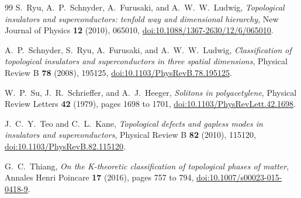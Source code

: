 \documentclass[12pt]{article}
\theoremstyle{definition}
\theoremstyle{remark}
\begin{document}
\begin{thebibliography}{99}
S.~Ryu, A.~P.~Schnyder, A.~Furusaki, and A.~W.~W.~Ludwig,
\emph{Topological insulators and superconductors: tenfold way and
dimensional hierarchy},
New Journal of Physics \textbf{12} (2010), 065010,
\href{https://doi.org/10.1088/1367-2630/12/6/065010}{doi:10.1088/1367-2630/12/6/065010}.

A.~P.~Schnyder, S.~Ryu, A.~Furusaki, and A.~W.~W.~Ludwig,
\emph{Classification of topological insulators and superconductors in three
spatial dimensions},
Physical Review B \textbf{78} (2008), 195125,
\href{https://doi.org/10.1103/PhysRevB.78.195125}{doi:10.1103/PhysRevB.78.195125}.

W.~P.~Su, J.~R.~Schrieffer, and A.~J.~Heeger,
\emph{Solitons in polyacetylene},
Physical Review Letters \textbf{42} (1979), pages 1698 to 1701,
\href{https://doi.org/10.1103/PhysRevLett.42.1698}{doi:10.1103/PhysRevLett.42.1698}.

J.~C.~Y.~Teo and C.~L.~Kane,
\emph{Topological defects and gapless modes in insulators and
superconductors},
Physical Review B \textbf{82} (2010), 115120,
\href{https://doi.org/10.1103/PhysRevB.82.115120}{doi:10.1103/PhysRevB.82.115120}.

G.~C.~Thiang,
\emph{On the K-theoretic classification of topological phases of matter},
Annales Henri Poincare \textbf{17} (2016), pages 757 to 794,
\href{https://doi.org/10.1007/s00023-015-0418-9}{doi:10.1007/s00023-015-0418-9}.

\end{thebibliography}
\end{document}
